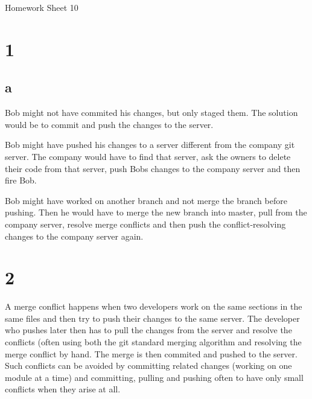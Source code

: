 \documentclass[11pt,a4paper]{article}
\begin{document}
\begin{center}
{\Large Homework Sheet 10}
\end{center}

\thispagestyle{empty}
\pagestyle{empty}

\section*{1}

\subsection*{a}

Bob might not have commited his changes, but only staged them. The
solution would be to commit and push the changes to the server.

Bob might have pushed his changes to a server different from the company
git server. The company would have to find that server, ask the owners
to delete their code from that server, push Bobs changes to the company
server and then fire Bob.

Bob might have worked on another branch and not merge the branch before
pushing. Then he would have to merge the new branch into master, pull from
the company server, resolve merge conflicts and then push the conflict-resolving
changes to the company server again.

\section*{2}

A merge conflict happens when two developers work on the same sections
in the same files and then try to push their changes to the same server.
The developer who pushes later then has to pull the changes from the
server and resolve the conflicts (often using both the git standard
merging algorithm and resolving the merge conflict by hand. The merge is
then commited and pushed to the server. Such conflicts can be avoided
by committing related changes (working on one module at a time) and
committing, pulling and pushing often to have only small conflicts when
they arise at all.
\end{document}
